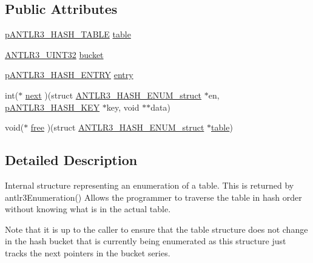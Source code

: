 \subsection*{Public Attributes}
\begin{DoxyCompactItemize}
\item 
\hyperlink{antlr3interfaces_8h_a8fd297514ac4bb022d25b65da9954adb}{p\-A\-N\-T\-L\-R3\-\_\-\-H\-A\-S\-H\-\_\-\-T\-A\-B\-L\-E} \hyperlink{struct_a_n_t_l_r3___h_a_s_h___e_n_u_m__struct_ac6f3d9cc871f25ae1f009a3c816721a4}{table}
\item 
\hyperlink{antlr3defs_8h_ac41f744abd0fd25144b9eb9d11b1dfd1}{A\-N\-T\-L\-R3\-\_\-\-U\-I\-N\-T32} \hyperlink{struct_a_n_t_l_r3___h_a_s_h___e_n_u_m__struct_ad53b9a754de26c4fba1c9c6379279c65}{bucket}
\item 
\hyperlink{antlr3interfaces_8h_a23202440c7441d8812a77e62318aafc9}{p\-A\-N\-T\-L\-R3\-\_\-\-H\-A\-S\-H\-\_\-\-E\-N\-T\-R\-Y} \hyperlink{struct_a_n_t_l_r3___h_a_s_h___e_n_u_m__struct_a0d890c54d35efa0166d2d780c08e6e57}{entry}
\item 
int($\ast$ \hyperlink{struct_a_n_t_l_r3___h_a_s_h___e_n_u_m__struct_a2d8768bcca37e77b64cc9ab2651ce134}{next} )(struct \hyperlink{struct_a_n_t_l_r3___h_a_s_h___e_n_u_m__struct}{A\-N\-T\-L\-R3\-\_\-\-H\-A\-S\-H\-\_\-\-E\-N\-U\-M\-\_\-struct} $\ast$en, \hyperlink{antlr3collections_8h_a1ee403fb57021487a3ed534abe05fb2a}{p\-A\-N\-T\-L\-R3\-\_\-\-H\-A\-S\-H\-\_\-\-K\-E\-Y} $\ast$key, void $\ast$$\ast$data)
\item 
void($\ast$ \hyperlink{struct_a_n_t_l_r3___h_a_s_h___e_n_u_m__struct_ab6e60503e41b2e8c95e3edd5a23e76aa}{free} )(struct \hyperlink{struct_a_n_t_l_r3___h_a_s_h___e_n_u_m__struct}{A\-N\-T\-L\-R3\-\_\-\-H\-A\-S\-H\-\_\-\-E\-N\-U\-M\-\_\-struct} $\ast$\hyperlink{struct_a_n_t_l_r3___h_a_s_h___e_n_u_m__struct_ac6f3d9cc871f25ae1f009a3c816721a4}{table})
\end{DoxyCompactItemize}


\subsection{Detailed Description}
Internal structure representing an enumeration of a table. This is returned by antlr3\-Enumeration() Allows the programmer to traverse the table in hash order without knowing what is in the actual table.

Note that it is up to the caller to ensure that the table structure does not change in the hash bucket that is currently being enumerated as this structure just tracks the next pointers in the bucket series. 

